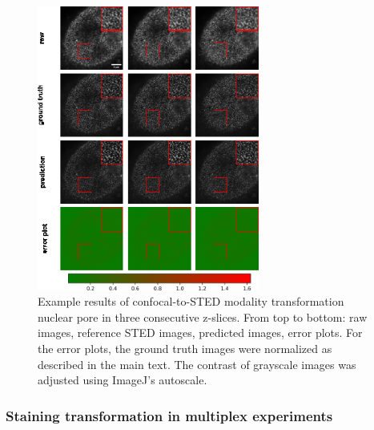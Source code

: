 \begin{figure}
\hypertarget{fig:modality_np}{%
\centering
\includegraphics[width=0.65\textwidth,height=0.7\textheight]{images/np_manuscript.png}
\caption{Example results of confocal-to-STED modality transformation nuclear pore in three consecutive z-slices. From top to bottom: raw images, reference STED images, predicted images, error plots. For the error plots, the ground truth images were normalized as described in the main text. The contrast of grayscale images was adjusted using ImageJ's autoscale.}\label{fig:modality_np}
}
\end{figure}

\hypertarget{staining-transformation-in-multiplex-experiments}{%
\subsubsection{Staining transformation in multiplex experiments}\label{staining-transformation-in-multiplex-experiments}}

